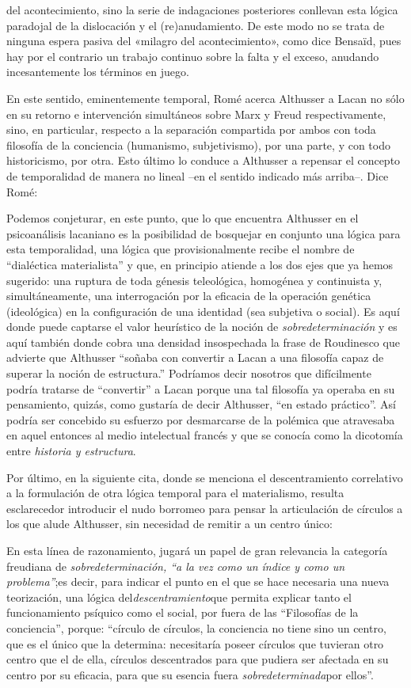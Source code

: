 del acontecimiento, sino la serie de indagaciones posteriores conllevan esta lógica paradojal de la dislocación y el (re)anudamiento. De este modo no se trata de ninguna espera pasiva del «milagro del acontecimiento», como dice Bensaïd, pues hay por el contrario un trabajo continuo sobre la falta y el exceso, anudando incesantemente los términos en juego.

En este sentido, eminentemente temporal, Romé acerca Althusser a Lacan no sólo en su retorno e intervención simultáneos sobre Marx y Freud respectivamente, sino, en particular, respecto a la separación compartida por ambos con toda filosofía de la conciencia (humanismo, subjetivismo), por una parte, y con todo historicismo, por otra. Esto último lo conduce a Althusser a repensar el concepto de temporalidad de manera no lineal --en el sentido indicado más arriba--. Dice Romé:

Podemos conjeturar, en este punto, que lo que encuentra Althusser en el psicoanálisis lacaniano es la posibilidad de bosquejar en conjunto una lógica para esta temporalidad, una lógica que provisionalmente recibe el nombre de ``dialéctica materialista'' y que, en principio atiende a los dos ejes que ya hemos sugerido: una ruptura de toda génesis teleológica, homogénea y continuista y, simultáneamente, una interrogación por la eficacia de la operación genética (ideológica) en la configuración de una identidad (sea subjetiva o social). Es aquí donde puede captarse el valor heurístico de la noción de \emph{sobredeterminación} y es aquí también donde cobra una densidad insospechada la frase de Roudinesco que advierte que Althusser ``soñaba con convertir a Lacan a una filosofía capaz de superar la noción de estructura.'' Podríamos decir nosotros que difícilmente podría tratarse de ``convertir'' a Lacan porque una tal filosofía ya operaba en su pensamiento, quizás, como gustaría de decir Althusser, ``en estado práctico''. Así podría ser concebido su esfuerzo por desmarcarse de la polémica que atravesaba en aquel entonces al medio intelectual francés y que se conocía como la dicotomía entre \emph{historia y estructura}.

Por último, en la siguiente cita, donde se menciona el descentramiento correlativo a la formulación de otra lógica temporal para el materialismo, resulta esclarecedor introducir el nudo borromeo para pensar la articulación de círculos a los que alude Althusser, sin necesidad de remitir a un centro único:

En esta línea de razonamiento, jugará un papel de gran relevancia la categoría freudiana de \emph{sobredeterminación, ``a la vez como un índice y como un problema''};es decir, para indicar el punto en el que se hace necesaria una nueva teorización, una lógica del\emph{descentramiento}que permita explicar tanto el funcionamiento psíquico como el social, por fuera de las ``Filosofías de la conciencia'', porque: ``círculo de círculos, la conciencia no tiene sino un centro, que es el único que la determina: necesitaría poseer círculos que tuvieran otro centro que el de ella, círculos descentrados para que pudiera ser afectada en su centro por su eficacia, para que su esencia fuera \emph{sobredeterminada}por ellos''.

